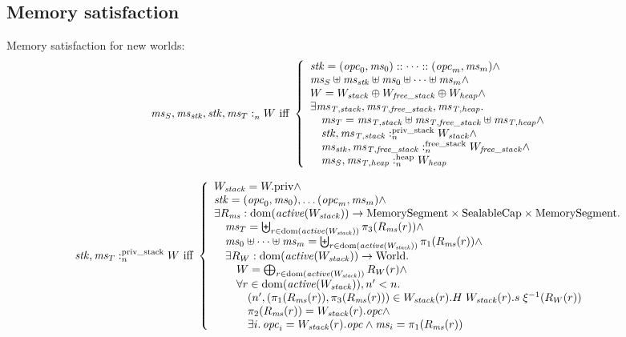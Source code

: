 \documentclass[a4paper]{article}
\begin{document}
\subsection{Memory satisfaction}
{\color{DarkGreen}
Memory satisfaction for new worlds:
\[
  \mathit{ms}_S,\mathit{ms}_{\mathit{stk}},\mathit{stk},\mathit{ms}_T :_{n}^{}W \text{ iff } 
  \left\{
    \begin{array}{l}
      \mathit{stk} = (\mathit{opc}_0,\mathit{ms}_0):: \dots :: (\mathit{opc}_m,\mathit{ms}_m) \wedge \\
      \mathit{ms}_S \uplus \mathit{ms}_{\mathit{stk}} \uplus \mathit{ms}_0 \uplus \dots \uplus \mathit{ms}_m  \wedge\\
      W = W_{\mathit{stack}} \oplus W_{\mathit{free\_stack}} \oplus W_{\mathit{heap}} \wedge\\
      \exists \mathit{ms}_{\mathit{T,stack}}, \mathit{ms}_{\mathit{T,free\_stack}}, \mathit{ms}_{\mathit{T,heap}}\ldotp \\
      \quad \mathit{ms}_T = \mathit{ms}_{\mathit{T,stack}} \uplus \mathit{ms}_{\mathit{T,free\_stack}} \uplus \mathit{ms}_{\mathit{T,heap}} \wedge \\
      \quad \mathit{stk},\mathit{ms}_{\mathit{T,stack}} :_{n}^{\text{priv\_stack}}W_{\mathit{stack}} \wedge \\
      \quad \mathit{ms}_{\mathit{stk}},\mathit{ms}_{\mathit{T,free\_stack}} :_{n}^{\text{free\_stack}}W_{\mathit{free\_stack}} \wedge \\
      \quad \mathit{ms}_S,\mathit{ms}_{\mathit{T,heap}} :_{n}^{\text{heap}}W_{\mathit{heap}}
    \end{array}
  \right.
\]


\[
  \memSatStack{\stk,\ms_T}{W} \text{ iff } 
  \left\{
    \begin{array}{l}
      W_\var{stack} = \pwpriv \wedge \\
      \stk = (\opc_0,\ms_0), \dots (\opc_m,\ms_m) \wedge \\
      \exists R_\ms : \dom(\activeReg{W_\var{stack}}) \fun \MemSeg \times \SealableCaps \times \MemSeg \ldotp \\
      \quad \ms_T = \biguplus_{r \in \dom(\activeReg{W_\var{stack}})} \pi_3(R_\ms(r)) \wedge \\
      \quad \ms_0 \uplus \dots \uplus \ms_m = \biguplus_{r \in \dom(\activeReg{W_\var{stack}})} \pi_1(R_\ms(r)) \wedge \\
      \quad \exists R_W : \dom(\activeReg{W_\var{stack}}) \fun \World \ldotp \\
      \qquad W = \bigoplus_{r \in \dom(\activeReg{W_\var{stack}})} R_W(r) \wedge \\
      \qquad \forall r \in \dom(\activeReg{W_\var{stack}}), n' < n \ldotp \\
      \qquad \quad \npair[n']{(\pi_1(R_\ms(r)),\pi_3(R_\ms(r))} \in W_\var{stack}(r).H \; W_\var{stack}(r).s \; \xi^{-1}(R_W(r)) \\
      \qquad \quad \pi_2(R_\ms(r)) = W_\var{stack}(r).\opc \wedge\\
      \qquad \quad \exists i \ldotp \opc_i = W_\var{stack}(r).\opc \wedge \ms_i = \pi_1 (R_\ms(r))
    \end{array}
  \right.
\]

}
\end{document}

